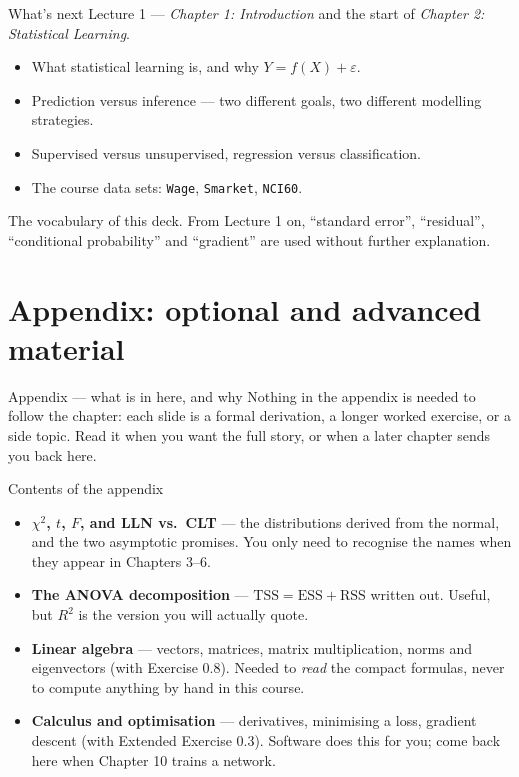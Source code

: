 \documentclass[aspectratio=169,11pt]{beamer}
\begin{document}
\begin{frame}{What's next}
  Lecture 1 --- \emph{Chapter 1: Introduction} and the start of
  \emph{Chapter 2: Statistical Learning}.
  \begin{itemize}
    \item What statistical learning is, and why $Y = f(X) + \varepsilon$.
    \item Prediction versus inference --- two different goals, two different
          modelling strategies.
    \item Supervised versus unsupervised, regression versus classification.
    \item The course data sets: \texttt{Wage}, \texttt{Smarket}, \texttt{NCI60}.
  \end{itemize}
  \begin{takeaway}
    The vocabulary of this deck. From Lecture 1 on, ``standard error'',
    ``residual'', ``conditional probability'' and ``gradient'' are used
    without further explanation.
  \end{takeaway}
\end{frame}


\appendix
\AtBeginSection[]{}
\section{Appendix: optional and advanced material}

\begin{frame}{Appendix --- what is in here, and why}
  \small
  Nothing in the appendix is needed to follow the chapter: each slide is a
  formal derivation, a longer worked exercise, or a side topic. Read it when
  you want the full story, or when a later chapter sends you back here.
  \begin{block}{Contents of the appendix}
    \begin{itemize}
      \item \textbf{$\chi^2$, $t$, $F$, and LLN vs.\ CLT} --- the distributions derived from the normal, and the two asymptotic promises. You only need to recognise the names when they appear in Chapters 3--6.
      \item \textbf{The ANOVA decomposition} --- $\mathrm{TSS}=\mathrm{ESS}+\mathrm{RSS}$ written out. Useful, but $R^2$ is the version you will actually quote.
      \item \textbf{Linear algebra} --- vectors, matrices, matrix multiplication, norms and eigenvectors (with Exercise 0.8). Needed to \emph{read} the compact formulas, never to compute anything by hand in this course.
      \item \textbf{Calculus and optimisation} --- derivatives, minimising a loss, gradient descent (with Extended Exercise 0.3). Software does this for you; come back here when Chapter 10 trains a network.
    \end{itemize}
  \end{block}
\end{frame}
\end{document}
